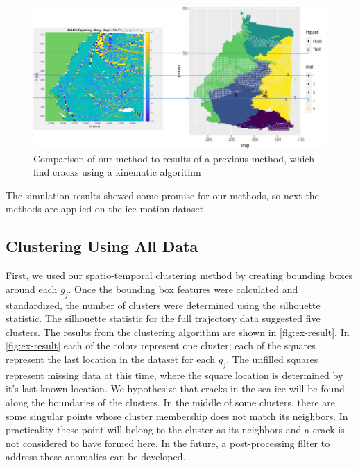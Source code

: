 \documentclass[12pt]{article}
\begin{document}
\begin{figure}[tbp]

{\centering \includegraphics[width=1\linewidth,]{images/all_weeks_comp_correct} 

}

\caption{Comparison of our method to results of a previous method, which find cracks using a kinematic algorithm}\label{fig:all-week-comp}
\end{figure}

The simulation results showed some promise for our methods, so next the
methods are applied on the ice motion dataset.

\hypertarget{clustering-using-all-data}{%
\subsection{Clustering Using All Data}\label{clustering-using-all-data}}

First, we used our spatio-temporal clustering method by creating
bounding boxes around each \(g_j\). Once the bounding box features were
calculated and standardized, the number of clusters were determined
using the silhouette statistic. The silhouette statistic for the full
trajectory data suggested five clusters. The results from the clustering
algorithm are shown in \cref{fig:ex-result}. In \cref{fig:ex-result}
each of the colors represent one cluster; each of the squares represent
the last location in the dataset for each \(g_j\). The unfilled squares
represent missing data at this time, where the square location is
determined by it's last known location. We hypothesize that cracks in
the sea ice will be found along the boundaries of the clusters. In the
middle of some clusters, there are some singular points whose cluster
membership does not match its neighbors. In practicality these point
will belong to the cluster as its neighbors and a crack is not
considered to have formed here. In the future, a post-processing filter
to address these anomalies can be developed.
\end{document}
